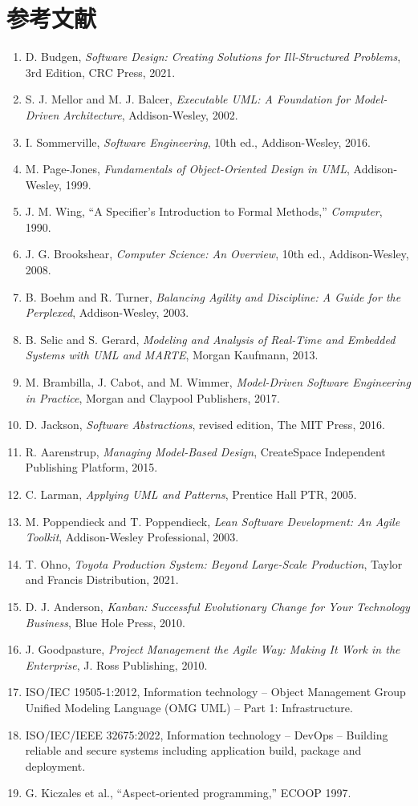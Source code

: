 \documentclass[a4paper,11pt]{ltjsarticle}
\begin{document}
\section{参考文献}
\begin{enumerate}
  \item D. Budgen, \textit{Software Design: Creating Solutions for Ill-Structured Problems}, 3rd Edition, CRC Press, 2021.
  \item S. J. Mellor and M. J. Balcer, \textit{Executable UML: A Foundation for Model-Driven Architecture}, Addison-Wesley, 2002.
  \item I. Sommerville, \textit{Software Engineering}, 10th ed., Addison-Wesley, 2016.
  \item M. Page-Jones, \textit{Fundamentals of Object-Oriented Design in UML}, Addison-Wesley, 1999.
  \item J. M. Wing, ``A Specifier's Introduction to Formal Methods,'' \textit{Computer}, 1990.
  \item J. G. Brookshear, \textit{Computer Science: An Overview}, 10th ed., Addison-Wesley, 2008.
  \item B. Boehm and R. Turner, \textit{Balancing Agility and Discipline: A Guide for the Perplexed}, Addison-Wesley, 2003.
  \item B. Selic and S. Gerard, \textit{Modeling and Analysis of Real-Time and Embedded Systems with UML and MARTE}, Morgan Kaufmann, 2013.
  \item M. Brambilla, J. Cabot, and M. Wimmer, \textit{Model-Driven Software Engineering in Practice}, Morgan and Claypool Publishers, 2017.
  \item D. Jackson, \textit{Software Abstractions}, revised edition, The MIT Press, 2016.
  \item R. Aarenstrup, \textit{Managing Model-Based Design}, CreateSpace Independent Publishing Platform, 2015.
  \item C. Larman, \textit{Applying UML and Patterns}, Prentice Hall PTR, 2005.
  \item M. Poppendieck and T. Poppendieck, \textit{Lean Software Development: An Agile Toolkit}, Addison-Wesley Professional, 2003.
  \item T. Ohno, \textit{Toyota Production System: Beyond Large-Scale Production}, Taylor and Francis Distribution, 2021.
  \item D. J. Anderson, \textit{Kanban: Successful Evolutionary Change for Your Technology Business}, Blue Hole Press, 2010.
  \item J. Goodpasture, \textit{Project Management the Agile Way: Making It Work in the Enterprise}, J. Ross Publishing, 2010.
  \item ISO/IEC 19505-1:2012, Information technology -- Object Management Group Unified Modeling Language (OMG UML) -- Part 1: Infrastructure.
  \item ISO/IEC/IEEE 32675:2022, Information technology -- DevOps -- Building reliable and secure systems including application build, package and deployment.
  \item G. Kiczales et al., ``Aspect-oriented programming,'' ECOOP 1997.
\end{enumerate}
\end{document}
